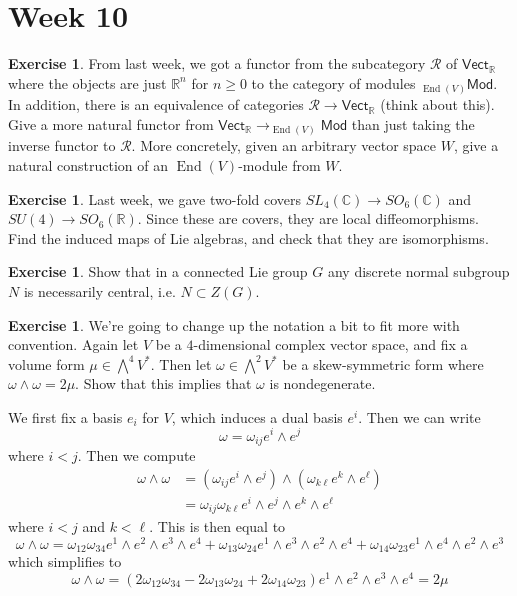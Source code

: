 \documentclass[psamsfonts]{amsart}
\theoremstyle{definition}
\newtheorem{exer}[thm]{Exercise}
\theoremstyle{remark}
\newcommand{\R}{\mathbb{R}}
\newcommand{\C}{\mathbb{C}}
\DeclareMathOperator{\End}{End}
\begin{document}
\section*{Week 10}
%
\begin{exer}
From last week, we got a functor from the subcategory $\mathscr{R}$ of $\mathsf{Vect}_\R$ where the objects are just $\R^n$ for $n \geq 0$ to the category of modules $ _{\End(V)}\mathsf{Mod}$. In addition, there is an equivalence of categories $\mathscr{R} \to \mathsf{Vect}_\R$ (think about this). Give a more natural functor from $\mathsf{Vect}_\R  \to  _{\End(V)}\mathsf{Mod}$ than just taking the inverse functor to $\mathscr{R}$. More concretely, given an arbitrary vector space $W$, give a natural construction of an $\End(V)$-module from $W$.
\end{exer}
%
\begin{exer}
Last week, we gave two-fold covers $SL_4(\C) \to SO_6(\C)$ and $SU(4) \to SO_6(\R)$. Since these are covers, they are local diffeomorphisms. Find the induced maps of Lie algebras, and check that they are isomorphisms.
\end{exer}
%
\begin{exer}
Show that in a connected Lie group $G$ any discrete normal subgroup $N$ is necessarily central, i.e. $N \subset Z(G)$.
\end{exer}
%
\begin{exer}
We're going to change up the notation a bit to fit more with convention. Again let $V$ be a $4$-dimensional complex vector space, and fix a volume form $\mu \in \bigwedge^4V^*$. Then let $\omega \in \bigwedge^2V^*$ be a skew-symmetric form where $\omega \wedge \omega = 2\mu$. Show that this implies that $\omega$ is nondegenerate.
\end{exer}
We first fix a basis $e_i$ for $V$, which induces a dual basis $e^i$. Then we can write
$$\omega = \omega_{ij}e^i \wedge e^j $$
where $i < j$. Then we compute
\begin{align*}
\omega \wedge \omega &= (\omega_{ij} e^i \wedge e^j) \wedge (\omega_{k\ell} e^k \wedge e^\ell) \\
&= \omega_{ij}\omega_{k\ell} e^i \wedge e^j \wedge e^k \wedge e^\ell
\end{align*}
where $i < j$ and $k < \ell$. This is then equal to
$$\omega \wedge \omega = \omega_{12}\omega_{34} e^1\wedge e^2 \wedge e^3 \wedge e^4  + \omega_{13}\omega_{24} e^1 \wedge e^3 \wedge e^2 \wedge e^4  + \omega_{14}\omega_{23} e^1 \wedge e^4 \wedge e^2 \wedge e^3$$
which simplifies to
$$\omega \wedge \omega = (2\omega_{12}\omega_{34} - 2\omega_{13}\omega_{24} + 2\omega_{14}\omega_{23}) e^1 \wedge e^2 \wedge e^3 \wedge e^4 = 2\mu $$
\end{document}
